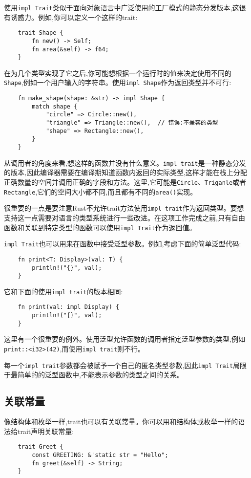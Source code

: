使用\texttt{impl Trait}类似于面向对象语言中广泛使用的工厂模式的静态分发版本,这很有诱惑力。例如,你可以定义一个这样的trait:
\begin{verbatim}
    trait Shape {
        fn new() -> Self;
        fn area(&self) -> f64;
    }
\end{verbatim}

在为几个类型实现了它之后,你可能想根据一个运行时的值来决定使用不同的\texttt{Shape},例如一个用户输入的字符串。使用\texttt{impl Shape}作为返回类型并不可行:
\begin{verbatim}
    fn make_shape(shape: &str) -> impl Shape {
        match shape {
            "circle" => Circle::new(),
            "triangle" => Triangle::new(),  // 错误:不兼容的类型
            "shape" => Rectangle::new(),
        }
    }
\end{verbatim}

从调用者的角度来看,想这样的函数并没有什么意义。\texttt{impl trait}是一种静态分发的版本,因此编译器需要在编译期知道函数内返回的实际类型,这样才能在栈上分配正确数量的空间并调用正确的字段和方法。这里,它可能是\texttt{Circle}、\texttt{Triganle}或者\texttt{Rectangle},它们的空间大小都不同,而且都有不同的\texttt{area()}实现。

很重要的一点是要注意Rust不允许trait方法使用\texttt{impl trait}作为返回类型。要想支持这一点需要对语言的类型系统进行一些改进。在这项工作完成之前,只有自由函数和关联到特定类型的函数可以使用\texttt{impl Trait}作为返回值。

\texttt{impl Trait}也可以用来在函数中接受泛型参数。例如,考虑下面的简单泛型代码:
\begin{verbatim}
    fn print<T: Display>(val: T) {
        println!("{}", val);
    }
\end{verbatim}

它和下面的使用\texttt{impl trait}的版本相同:
\begin{verbatim}
    fn print(val: impl Display) {
        println!("{}", val);
    }
\end{verbatim}

这里有一个很重要的例外。使用泛型允许函数的调用者指定泛型参数的类型,例如\texttt{print::<i32>(42)},而使用\texttt{impl trait}则不行。

每一个\texttt{impl trait}参数都会被赋予一个自己的匿名类型参数,因此\texttt{impl Trait}局限于最简单的的泛型函数中,不能表示参数的类型之间的关系。

\subsection{关联常量}
像结构体和枚举一样,trait也可以有关联常量。你可以用和结构体或枚举一样的语法给trait声明关联常量:
\begin{verbatim}
    trait Greet {
        const GREETING: &'static str = "Hello";
        fn greet(&self) -> String;
    }
\end{verbatim}

